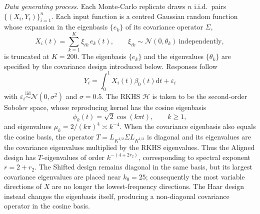 \documentclass[aos]{imsart}
\newcommand{\ud}{\mathrm d}
\newcommand{\mH}{\mathcal H}
\theoremstyle{plain}
\theoremstyle{definition}
\theoremstyle{definition}
\begin{document}
\medskip\noindent\textit{Data generating process.}
Each Monte-Carlo replicate draws $n$ i.i.d.\ pairs $\{(X_i,Y_i)\}_{i=1}^n$. Each input function is a centred Gaussian random function whose expansion in the eigenbasis $\{e_k\}$ of its covariance operator $\Sigma$,
\[
X_i(t)=\sum_{k=1}^{K}\xi_{ik}\,e_k(t),\qquad \xi_{ik}\sim\mathcal N(0,\theta_k)\ \text{independently},
\]
is truncated at $K=200$. The eigenbasis $\{e_k\}$ and the eigenvalues $\{\theta_k\}$ are specified by the covariance design introduced below.
Responses follow \[Y_i=\int_0^1 X_i(t)\beta_0(t)\ud t+\varepsilon_i\] with $\varepsilon_i\stackrel{\text{iid}}{\sim}\mathcal N(0,\sigma^2)$ and $\sigma=0.5$. The RKHS $\mH$ is taken to be the second-order Sobolev space, whose reproducing kernel has the cosine eigenbasis
\[\phi_k(t)=\sqrt{2}\cos(k\pi t),\qquad k\ge 1,\]
and eigenvalues $\mu_k=2/(k\pi)^4\asymp k^{-4}$. When the covariance eigenbasis also equals the cosine basis, the operator $T=L_{K^{1/2}}\Sigma L_{K^{1/2}}$ is diagonal and its eigenvalues are the covariance eigenvalues multiplied by the RKHS eigenvalues. Thus the Aligned design has $T$-eigenvalues of order $k^{-(4+2r_2)}$, corresponding to spectral exponent $r=2+r_2$. The Shifted design remains diagonal in the same basis, but its largest covariance eigenvalues are placed near $k_0=25$; consequently the most variable directions of $X$ are no longer the lowest-frequency directions. The Haar design instead changes the eigenbasis itself, producing a non-diagonal covariance operator in the cosine basis.
\end{document}
